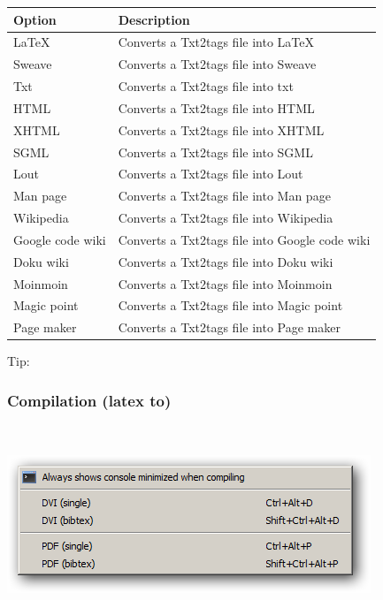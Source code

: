 \begin{scriptsize}\begin{tabularx}{\textwidth}{>{\hsize=0.3\hsize}X>{\hsize=0.7\hsize}X}\\
    \hline
    \textbf{Option} & \textbf{Description} \\
    \hline
    LaTeX & Converts a Txt2tags file into LaTeX \\
    Sweave & Converts a Txt2tags file into Sweave \\
    Txt & Converts a Txt2tags file into txt \\
    HTML & Converts a Txt2tags file into HTML \\
    XHTML & Converts a Txt2tags file into XHTML \\
    SGML & Converts a Txt2tags file into SGML \\
    Lout & Converts a Txt2tags file into Lout \\
    Man page & Converts a Txt2tags file into Man page \\
    Wikipedia & Converts a Txt2tags file into Wikipedia \\
    Google code wiki & Converts a Txt2tags file into Google code wiki \\
    Doku wiki & Converts a Txt2tags file into Doku wiki \\
    Moinmoin & Converts a Txt2tags file into Moinmoin \\
    Magic point & Converts a Txt2tags file into Magic point \\
    Page maker & Converts a Txt2tags file into Page maker \\
    \hline
  \end{tabularx}\end{scriptsize}

Tip: 


\hypertarget{menu_tools_processing_conversion_compilation}{}
\subsubsection{Compilation (latex to)}\\

\includegraphics[scale=0.50]{./res/menu_tools_processing_compilation.png}\\


